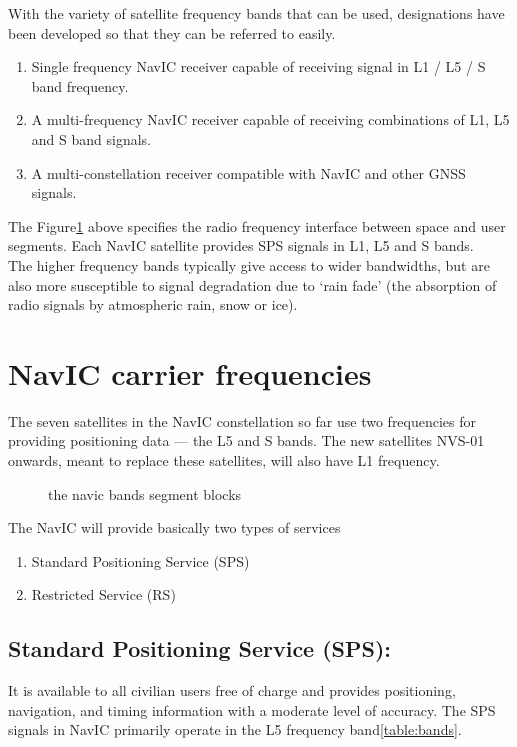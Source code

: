 With the variety of satellite frequency bands that can be used, designations have been developed so that they can be referred to easily. 
\begin{enumerate}
	\item Single frequency NavIC receiver capable of receiving signal in L1 / L5 / S band frequency.
	\item A multi-frequency NavIC receiver capable of receiving combinations of L1, L5 and S band signals.
	\item A multi-constellation receiver compatible with NavIC and other GNSS signals.
\end{enumerate}

	
The Figure\ref{figs:bandsfig} above specifies the radio frequency interface between space and user segments.
Each NavIC satellite provides SPS signals in L1, L5 and S bands.
\\
The higher frequency bands typically give access to wider bandwidths, but are also more susceptible to signal degradation due to ‘rain fade’ (the absorption of radio signals by atmospheric rain, snow or ice).
\section{NavIC carrier frequencies}	
The seven satellites in the NavIC constellation so far use two frequencies for providing positioning data — the L5 and S bands. The new satellites NVS-01 onwards, meant to replace these satellites, will also have L1 frequency.


	\begin{figure}[h!]
	\centering
	
	\caption{the navic bands segment blocks}
	\label{figs:bandsfig}
	\end{figure}


The NavIC will provide basically two types of services
	\begin{enumerate}
	\item Standard Positioning Service (SPS)
	\item Restricted Service (RS)
	\end{enumerate}

		

\subsection{Standard Positioning Service (SPS):}
	It is available to all civilian users free of charge and provides positioning, navigation, and timing information with a moderate level of accuracy. The SPS signals in NavIC primarily operate in the L5 frequency band\ref{table:bands}.
